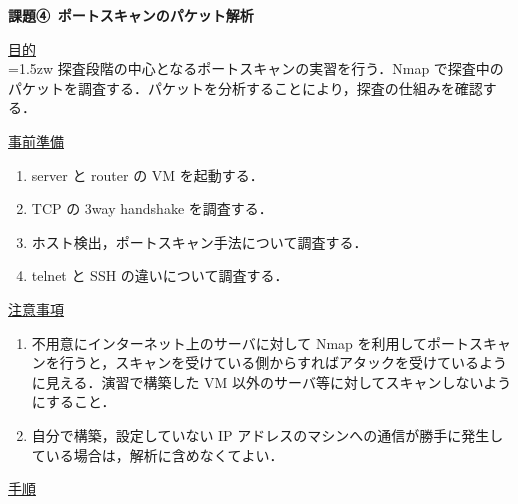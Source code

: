\documentclass[dvipdfmx,autodetect-engine, 12pt]{jsarticle}
\begin{document}
\begin{center}

{\LARGE \bfseries 課題④\, ポートスキャンのパケット解析\par}

\end{center}

\vspace{1cm}

{\LARGE \uline{目的}} \\

\hangindent=1.5zw
\noindent
探査段階の中心となるポートスキャンの実習を行う．Nmap で探査中のパケットを調査する．パケットを分析することにより，探査の仕組みを確認する．

\vspace{1cm}

{\LARGE \uline{事前準備}} 

\begin{enumerate}
    \item server と router の VM を起動する．
    \item TCP の 3way handshake を調査する．
    \item ホスト検出，ポートスキャン手法について調査する．
    \item telnet と SSH の違いについて調査する．
\end{enumerate}

\vspace{1cm}

{\LARGE \uline{注意事項}}

\begin{enumerate}[label=・]
    \item 不用意にインターネット上のサーバに対して Nmap を利用してポートスキャンを行うと，スキャンを受けている側からすればアタックを受けているように見える．演習で構築した VM 以外のサーバ等に対してスキャンしないようにすること．
    \item 自分で構築，設定していない IP アドレスのマシンへの通信が勝手に発生している場合は，解析に含めなくてよい．
\end{enumerate}

\vspace{1cm}

{\LARGE \uline{手順}} 
\end{document}
